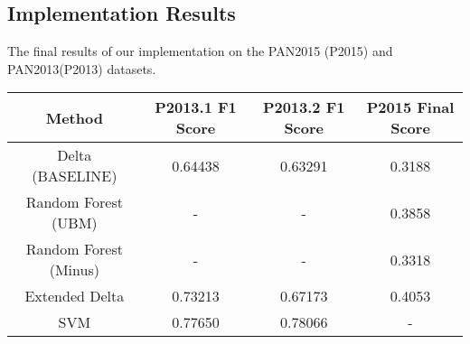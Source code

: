 \subsection{Implementation Results} \label{subsec:results}
The final results of our implementation on the PAN2015 (P2015) and PAN2013(P2013) datasets.
\begin{center}
\begin{tabular}{|c|c|c|c|}
\hline
\textbf{Method}             & \textbf{P2013.1 F1 Score} & \textbf{P2013.2 F1 Score} & \textbf{P2015 Final Score} \\ \hline
Delta (BASELINE)            & 0.64438                      & 0.63291                      & 0.3188                        \\ \hline
Random Forest (\gls{UBM}) & -                            & -                            & 0.3858                        \\ \hline
Random Forest (Minus)       & -                            & -                            & 0.3318                        \\ \hline
Extended Delta              & 0.73213                      & 0.67173                      & 0.4053                        \\ \hline
SVM                         & 0.77650                      & 0.78066                      & -                             \\ \hline
\end{tabular}

\end{center}
